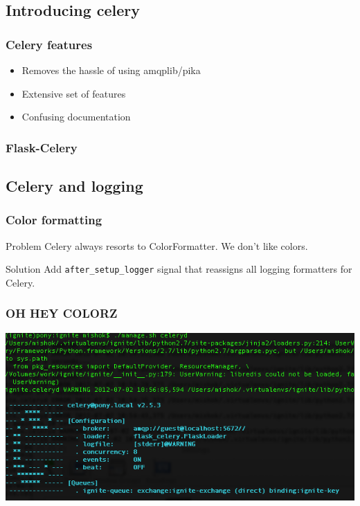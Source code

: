 \documentclass{beamer}
\begin{document}
\subsection{Introducing celery}

\begin{frame}
  \frametitle{Celery features}
  \begin{itemize}
  \item Removes the hassle of using amqplib/pika
  \item Extensive set of features
  \item Confusing documentation
  \end{itemize}
\end{frame}

\begin{frame}
  \frametitle{Flask-Celery}
\end{frame}


\subsection{Celery and logging}

\begin{frame}
  \frametitle{Color formatting}
  \begin{block}{Problem}
    Celery always resorts to ColorFormatter. We don't like colors.
  \end{block}
  \begin{block}{Solution}
    Add \texttt{after\_setup\_logger} signal that reassigns all
    logging formatters for Celery.
  \end{block}
\end{frame}

\begin{frame}
  \frametitle{OH HEY COLORZ}
  \includegraphics[scale=0.5]{images/celery-colored.png}
\end{frame}
\end{document}
